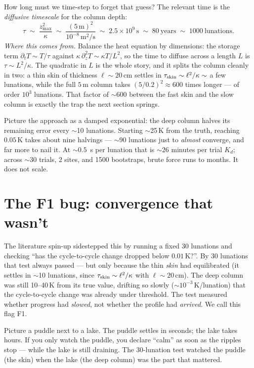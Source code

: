\documentclass[11pt]{report}
\begin{document}
How long must we time-step to forget that guess? The relevant time is the
\emph{diffusive timescale} for the column depth:
\begin{equation}
\tau \;\sim\; \frac{z_{\max}^2}{\kappa}
\;\sim\; \frac{(5\,\text{m})^2}{10^{-8}\,\text{m}^2/\text{s}}
\;\sim\; 2.5\!\times\!10^{9}\,\text{s}
\;\sim\; 80\ \text{years}
\;\sim\; 1000\ \text{lunations}.
\label{eq:tau}
\end{equation}
\emph{Where this comes from.} Balance the heat equation by dimensions: the
storage term $\partial_t T\sim T/\tau$ against $\kappa\,\partial_z^2 T\sim\kappa
T/L^2$, so the time to diffuse across a length $L$ is $\tau\sim L^2/\kappa$. The
quadratic in $L$ is the whole story, and it splits the column cleanly in two: a
thin skin of thickness $\ell\sim20$\,cm settles in
$\tau_{\rm skin}\sim\ell^2/\kappa\sim$ a few lunations, while the full $5$\,m
column takes $(5/0.2)^2\approx600$ times longer --- of order $10^3$ lunations.
That factor of $\sim$600 between the fast skin and the slow column is exactly the
trap the next section springs.

Picture the approach as a damped exponential: the deep column halves its
remaining error every $\sim$10 lunations. Starting $\sim$25\,K from the truth, reaching $0.05$\,K takes about
nine halvings --- $\sim$90 lunations just to \emph{almost} converge, and far more
to nail it. At ${\sim}0.5$~s per lunation that is ${\sim}26$ minutes per trial $K_d$; across $\sim$30 trials,
2 sites, and 1500 bootstraps, brute force runs to months. It does not scale.

\section{The F1 bug: convergence that wasn't}\label{sec:f1}

The literature spin-up sidestepped this by running a fixed 30 lunations and
checking ``has the cycle-to-cycle change dropped below $0.01$\,K?''. By 30
lunations that test always passed --- but only because the thin \emph{skin} had
equilibrated (it settles in $\sim$10 lunations, since
$\tau_{\rm skin}\sim\ell^2/\kappa$ with $\ell\!\sim\!20$\,cm). The deep column
was still 10--40\,K from its true value, drifting so slowly
($\sim$$10^{-3}$\,K/lunation) that the cycle-to-cycle change was already under
threshold. The test measured whether progress had \emph{slowed}, not whether the
profile had \emph{arrived}. We call this flag F1.

\begin{plain}
Picture a puddle next to a lake. The puddle settles in seconds; the lake takes
hours. If you only watch the puddle, you declare ``calm'' as soon as the ripples
stop --- while the lake is still draining. The 30-lunation test watched the
puddle (the skin) when the lake (the deep column) was the part that mattered.
\end{plain}
\end{document}
